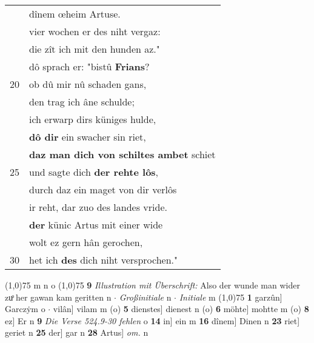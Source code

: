 \documentclass[8pt,a4paper,notitlepage]{article}
\begin{document}
\begin{table}[ht]
\begin{minipage}[t]{0.5\linewidth}
\begin{tabular}{rl}
 & dînem œheim Artuse.\\ 
 & vier wochen er des niht vergaz:\\ 
 & die zît ich mit den hunden az."\\ 
 & dô sprach er: "bistû \textbf{Frians}?\\ 
20 & ob dû mir nû schaden gans,\\ 
 & den trag ich âne schulde;\\ 
 & ich erwarp dirs küniges hulde,\\ 
 & \textbf{dô dir} ein swacher sin riet,\\ 
 & \textbf{daz man dich von schiltes ambet} schiet\\ 
25 & und sagte dich \textbf{der rehte lôs},\\ 
 & durch daz ein maget von dir verlôs\\ 
 & ir reht, dar zuo des landes vride.\\ 
 & \textbf{der} künic Artus mit einer wide\\ 
 & wolt ez gern hân gerochen,\\ 
30 & het ich \textbf{des} dich niht versprochen."\\ 
\end{tabular}
\scriptsize
\line(1,0){75} \newline
m n o \newline
\line(1,0){75} \newline
\textbf{9} \textit{Illustration mit Überschrift:} Also der wunde man wider zuͦ her gawan kam geritten n   $\cdot$ \textit{Großinitiale} n   $\cdot$ \textit{Initiale} m  \newline
\line(1,0){75} \newline
\textbf{1} garzûn] Garczẏm o  $\cdot$ vilân] vilam m (o) \textbf{5} dienstes] dienest n (o) \textbf{6} möhte] mohtte m (o) \textbf{8} ez] Er n \textbf{9} \textit{Die Verse 524.9-30 fehlen} o  \textbf{14} in] ein m \textbf{16} dînem] Dinen n \textbf{23} riet] geriet n \textbf{25} der] gar n \textbf{28} Artus] \textit{om.} n \newline
\end{minipage}
\end{table}
\newpage
\end{document}
